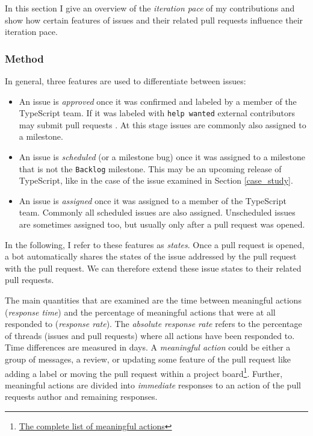 \documentclass[12pt]{scrartcl}
\def\code#1{\texttt{\frenchspacing#1}}
\begin{document}
In this section I give an overview of the \textit{iteration pace} of my contributions and show how certain features of issues and their related pull requests influence their iteration pace.

\subsubsection{Method}

In general, three features are used to differentiate between issues:

\begin{itemize}
    \item An issue is \textit{approved} once it was confirmed and labeled by a member of the TypeScript team. If it was labeled with \code{help wanted} external contributors may submit pull requests \cite{ContributingGuidelines}. At this stage issues are commonly also assigned to a milestone.
    \item An issue is \textit{scheduled} (or a milestone bug) once it was assigned to a milestone that is not the \code{Backlog} milestone. This may be an upcoming release of TypeScript, like in the case of the issue examined in Section \ref{case_study}.
    \item An issue is \textit{assigned} once it was assigned to a member of the TypeScript team. Commonly all scheduled issues are also assigned. Unscheduled issues are sometimes assigned too, but usually only after a pull request was opened.
\end{itemize}

In the following, I refer to these features as \textit{states}. Once a pull request is opened, a bot automatically shares the states of the issue addressed by the pull request with the pull request. We can therefore extend these issue states to their related pull requests.

The main quantities that are examined are the time between meaningful actions (\textit{response time}) and the percentage of meaningful actions that were at all responded to (\textit{response rate}). The \textit{absolute response rate} refers to the percentage of threads (issues and pull requests) where all actions have been responded to. Time differences are measured in days. A \textit{meaningful action} could be either a group of messages, a review, or updating some feature of the pull request like adding a label or moving the pull request within a project board\footnote{\href{https://github.com/jonhue/osp/tree/sources/analysis}{The complete list of meaningful actions}}. Further, meaningful actions are divided into \textit{immediate} responses to an action of the pull requests author and remaining responses.
\end{document}
